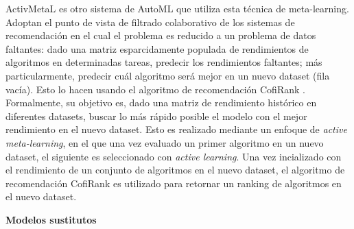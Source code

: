 ActivMetaL \cite{activmetal} es otro sistema de AutoML que utiliza esta técnica de meta-learning. Adoptan el punto de vista de filtrado colaborativo de los sistemas de recomendación en el cual el problema es reducido a un problema de datos faltantes: dado una matriz esparcidamente populada de rendimientos de algoritmos en determinadas tareas, predecir los rendimientos faltantes; más particularmente, predecir cuál algoritmo será mejor en un nuevo dataset (fila vacía). Esto lo hacen usando el algoritmo de recomendación CofiRank \cite{weimar2007cofirank}. Formalmente, su objetivo es, dado una matriz de rendimiento histórico en diferentes datasets, buscar lo más rápido posible el modelo con el mejor rendimiento en el nuevo dataset. Esto es realizado mediante un enfoque de \textit{active meta-learning}, en el que una vez evaluado un primer algoritmo en un nuevo dataset, el siguiente es seleccionado con \textit{active learning}. Una vez incializado con el rendimiento de un conjunto de algoritmos en el nuevo dataset, el algoritmo de recomendación CofiRank es utilizado para retornar un ranking de algoritmos en el nuevo dataset. %

\quad

\textbf{Modelos sustitutos}


